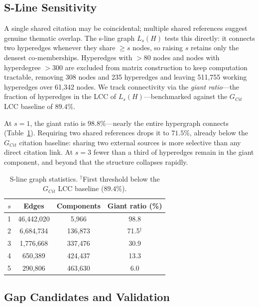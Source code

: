 \subsection{S-Line Sensitivity}\label{subsec:hg:sline}

A single shared citation may be coincidental; multiple shared references suggest genuine thematic overlap. The s-line graph $L_s(H)$ tests this directly: it connects two hyperedges whenever they share $\geq s$ nodes, so raising $s$ retains only the densest co-memberships.
Hyperedges with $> 80$ nodes and nodes with hyperdegree $> 300$ are excluded from matrix construction to keep computation tractable, removing 308 nodes and 235 hyperedges and leaving 511,755 working hyperedges over 61,342 nodes.
We track connectivity via the \emph{giant ratio}---the fraction of hyperedges in the LCC of $L_s(H)$---benchmarked against the $G_{Cit}$ LCC baseline of $89.4\%$.

At $s = 1$, the giant ratio is $98.8\%$---nearly the entire hypergraph connects (Table~\ref{tab:sline}). Requiring two shared references drops it to $71.5\%$, already below the $G_{Cit}$ citation baseline: sharing two external sources is more selective than any direct citation link. At $s = 3$ fewer than a third of hyperedges remain in the giant component, and beyond that the structure collapses rapidly.

\begin{table}[h]
  \centering
  \footnotesize
  \begin{tabular}{cccc}
    \toprule
    $s$ & Edges & Components & Giant ratio (\%) \\
    \midrule
     1 & 46{,}442{,}020 &   5{,}966 & 98.8 \\
     2 &  6{,}684{,}734 & 136{,}873 & 71.5$^\dag$ \\
     3 &  1{,}776{,}668 & 337{,}476 & 30.9 \\
     4 &    650{,}389   & 424{,}437 & 13.3 \\
     5 &    290{,}806   & 463{,}630 &  6.0 \\
    \bottomrule
  \end{tabular}
    \caption{S-line graph statistics.
           $^\dag$First threshold below the $G_{Cit}$ LCC baseline
           ($89.4\%$).}
  \label{tab:sline}
\end{table}

\subsection{Gap Candidates and Validation}
\label{subsec:hg:gaps}

